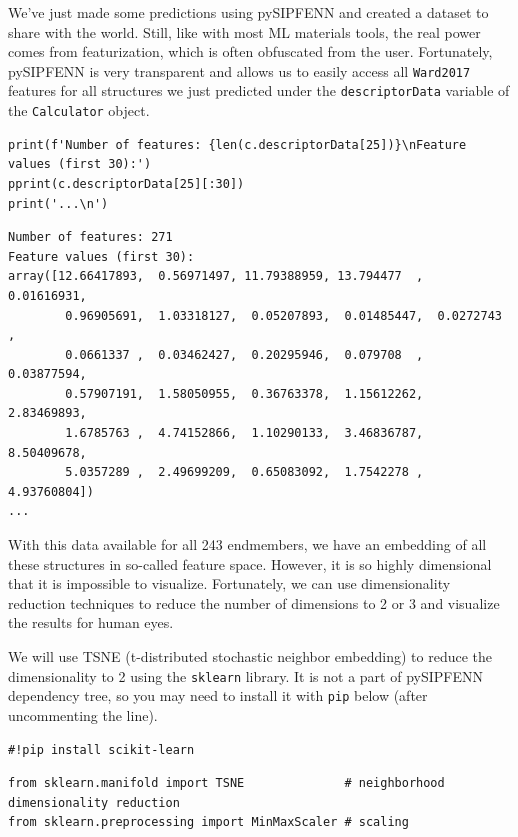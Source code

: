 We've just made some predictions using pySIPFENN and created a dataset
to share with the world. Still, like with most ML materials tools, the
real power comes from featurization, which is often obfuscated from the
user. Fortunately, pySIPFENN is very transparent and allows us to easily
access all \texttt{Ward2017} features for all
structures we just predicted under the
\texttt{descriptorData} variable of the
\texttt{Calculator} object.

\begin{verbatim}
print(f'Number of features: {len(c.descriptorData[25])}\nFeature values (first 30):')
pprint(c.descriptorData[25][:30])
print('...\n')
\end{verbatim}

\begin{verbatim}
Number of features: 271
Feature values (first 30):
array([12.66417893,  0.56971497, 11.79388959, 13.794477  ,  0.01616931,
        0.96905691,  1.03318127,  0.05207893,  0.01485447,  0.0272743 ,
        0.0661337 ,  0.03462427,  0.20295946,  0.079708  ,  0.03877594,
        0.57907191,  1.58050955,  0.36763378,  1.15612262,  2.83469893,
        1.6785763 ,  4.74152866,  1.10290133,  3.46836787,  8.50409678,
        5.0357289 ,  2.49699209,  0.65083092,  1.7542278 ,  4.93760804])
...
\end{verbatim}

With this data available for all 243 endmembers, we have an embedding of
all these structures in so-called feature space. However, it is so
highly dimensional that it is impossible to visualize. Fortunately, we
can use dimensionality reduction techniques to reduce the number of
dimensions to 2 or 3 and visualize the results for human eyes.

We will use TSNE (t-distributed stochastic neighbor embedding) to reduce
the dimensionality to 2 using the \texttt{sklearn}
library. It is not a part of pySIPFENN dependency tree, so you may need
to install it with \texttt{pip} below (after
uncommenting the line).

\begin{verbatim}
#!pip install scikit-learn
\end{verbatim}

\begin{verbatim}
from sklearn.manifold import TSNE              # neighborhood  dimensionality reduction
from sklearn.preprocessing import MinMaxScaler # scaling
\end{verbatim}

